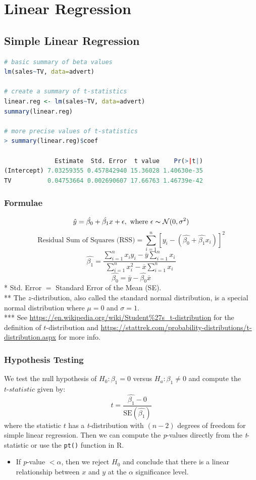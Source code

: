 \documentclass{article}
\begin{document}
\section{Linear Regression}
\subsection{Simple Linear Regression}
\begin{lstlisting}[language = R]
# basic summary of beta values
lm(sales~TV, data=advert)

# create a summary of t-statistics
linear.reg <- lm(sales~TV, data=advert)
summary(linear.reg)

# more precise values of t-statistics
> summary(linear.reg)$coef

              Estimate  Std. Error  t value    Pr(>|t|)
(Intercept) 7.03259355 0.457842940 15.36028 1.40630e-35
TV          0.04753664 0.002690607 17.66763 1.46739e-42

\end{lstlisting}
\subsubsection{Formulae}
$$\hat{y} = \hat{\beta_0} + \hat{\beta_1} x +\epsilon, \text{ where } \epsilon \thicksim \mathcal{N}(0, \sigma^2 )$$
$$\text{Residual Sum of Squares (RSS)} = \sum_{i=1}^{n}[y_i-(\hat{\beta_0} + \hat{\beta_1}x_i)]^2$$
$$\hat{\beta_1} = \frac{\sum_{i=1}^{n} x_iy_i - \overline{y}\sum_{i=1}^{n} x_i}{\sum_{i=1}^{n} x_i^2 - \overline{x}\sum_{i=1}^{n} x_i}$$
$$\hat{\beta_0} = \overline{y} - \hat{\beta_0}\overline{x}$$
* Std. Error $=$ Standard Error of the Mean (SE).\\
** The $z$-distribution, also called the standard normal distribution, is a special normal distribution where $\mu = 0$ and $\sigma = 1$.\\
*** See \url{https://en.wikipedia.org/wiki/Student\%27s_t-distribution} for the definition of $t$-distribution and \url{https://stattrek.com/probability-distributions/t-distribution.aspx} for more info.

\subsubsection{Hypothesis Testing}
We test the null hypothesis of $H_0: \beta_1 = 0$ versus $H_a: \beta_1 \neq 0$ and compute the $\textit{t-statistic}$ given by:
$$t = \frac{\hat{\beta_1}-0}{\text{SE}(\hat{\beta_1})}$$
where the statistic $t$ has a \textit{t}-distribution with $(n-2)$ degrees of freedom for simple linear regression. Then we can compute the \textit{p}-values directly from the \textit{t}-statistic or use the \texttt{pt()} function in R.
\begin{itemize}
    \item If \textit{p}-value $< \alpha$, then we reject $H_0$ and conclude that there is a linear relationship between $x$ and $y$ at the $\alpha$ significance level.
\end{itemize}
\end{document}
